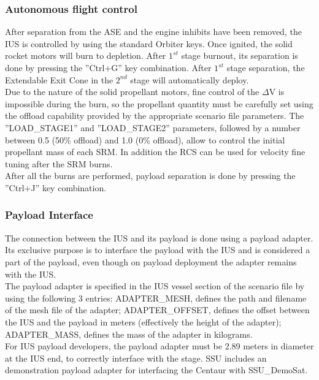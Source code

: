 \documentclass[Space_Shuttle_Ultra_Manual.tex]{subfiles}
\begin{document}
\begin{multicols*}{2}
\subsubsection{Autonomous flight control}
After separation from the ASE and the engine inhibits have been removed, the IUS is controlled by using the standard Orbiter keys. Once ignited, the solid rocket motors will burn to depletion. After $1^{st}$ stage burnout, its separation is done by pressing the ''Ctrl+G'' key combination. After $1^{st}$ stage separation, the Extendable Exit Cone in the $2^{nd}$ stage will automatically deploy.\\
Due to the nature of the solid propellant motors, fine control of the $\Delta$V is impossible during the burn, so the propellant quantity must be carefully set using the offload capability provided by the appropriate scenario file parameters. The ''LOAD\_STAGE1'' and ''LOAD\_STAGE2'' parameters, followed by a number between 0.5 (50\% offload) and 1.0 (0\% offload), allow to control the initial propellant mass of each SRM. In addition the RCS can be used for velocity fine tuning after the SRM burns.\\
After all the burns are performed, payload separation is done by pressing the ''Ctrl+J'' key combination.

\subsubsection{Payload Interface}
The connection between the IUS and its payload is done using a payload adapter. Its exclusive purpose is to interface the payload with the IUS and is considered a part of the payload, even though on payload deployment the adapter remains with the IUS.\\
The payload adapter is specified in the IUS vessel section of the scenario file by using the following 3 entries: ADAPTER\_MESH, defines the path and filename of the mesh file of the adapter; ADAPTER\_OFFSET, defines the offset between the IUS and the payload in meters (effectively the height of the adapter); ADAPTER\_MASS, defines the mass of the adapter in kilograms.\\
For IUS payload developers, the payload adapter must be 2.89 meters in diameter at the IUS end, to correctly interface with the stage. SSU includes an demonstration payload adapter for interfacing the Centaur with SSU\_DemoSat.

\end{multicols*}
\end{document}
